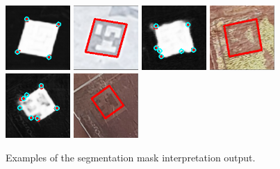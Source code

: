 \documentclass[10pt]{book}
\begin{document}
\begin{figure}
  \centering
     {\includegraphics[width=0.22\textwidth]{image/segpet_mask_8_pred_corners}}
     {\includegraphics[width=0.22\textwidth]{image/segpet_mask_8_pred_rect}}
     {\includegraphics[width=0.22\textwidth]{image/segpet_mask_10_pred_corners}}
     {\includegraphics[width=0.22\textwidth]{image/segpet_mask_10_pred_rect}}
     {\includegraphics[width=0.22\textwidth]{image/segpet_mask_6_pred_corners}}
     {\includegraphics[width=0.22\textwidth]{image/segpet_mask_6_pred_rect}}
  \caption{Examples of the segmentation mask interpretation output.}
  \label{fig:segpet_rect_interp}
\end{figure}
\end{document}
